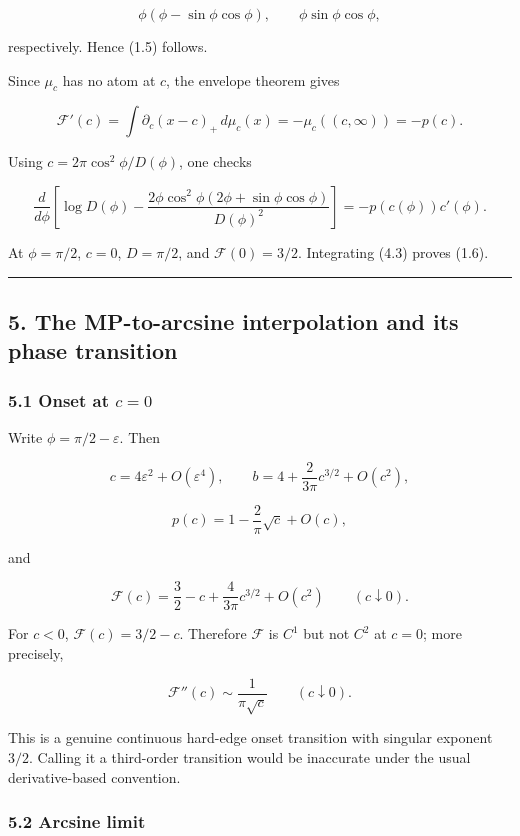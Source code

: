 \[
\phi(\phi-\sin\phi\cos\phi),
\qquad
\phi\sin\phi\cos\phi,
\]

respectively. Hence (1.5) follows.

Since \(\mu_c\) has no atom at \(c\), the envelope theorem gives

\[
\mathcal F'(c)
=\int\partial_c(x-c)_+\,d\mu_c(x)
=-\mu_c((c,\infty))=-p(c). \tag{DS-4.2}
\]

Using \(c=2\pi\cos^2\phi/D(\phi)\), one checks

\[
\frac{d}{d\phi}\left[
\log D(\phi)
-\frac{2\phi\cos^2\phi
(2\phi+\sin\phi\cos\phi)}{D(\phi)^2}
\right]
=-p(c(\phi))c'(\phi). \tag{DS-4.3}
\]

At \(\phi=\pi/2\), \(c=0\), \(D=\pi/2\), and
\(\mathcal F(0)=3/2\). Integrating (4.3) proves (1.6).

\begin{center}\rule{0.5\linewidth}{0.5pt}\end{center}

\subsection{5. The MP-to-arcsine interpolation and its phase transition}

\subsubsection{\texorpdfstring{5.1 Onset at \(c=0\)}{5.1 Onset at c=0}}

Write \(\phi=\pi/2-\varepsilon\). Then

\[
c=4\varepsilon^2+O(\varepsilon^4),
\qquad
b=4+\frac{2}{3\pi}c^{3/2}+O(c^2), \tag{DS-5.1}
\]

\[
p(c)=1-\frac{2}{\pi}\sqrt c+O(c), \tag{DS-5.2}
\]

and

\[
\boxed{
\mathcal F(c)=\frac32-c+\frac{4}{3\pi}c^{3/2}+O(c^2)
\qquad(c\downarrow0).} \tag{DS-5.3}
\]

For \(c<0\), \(\mathcal F(c)=3/2-c\). Therefore \(\mathcal F\) is
\(C^1\) but not \(C^2\) at \(c=0\); more precisely,

\[
\mathcal F''(c)\sim\frac1{\pi\sqrt c}\qquad(c\downarrow0).
\]

This is a genuine continuous hard-edge onset transition with singular
exponent \(3/2\). Calling it a third-order transition would be inaccurate
under the usual derivative-based convention.

\subsubsection{5.2 Arcsine limit}

